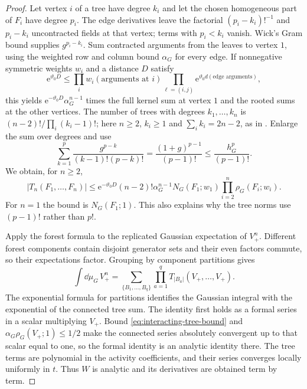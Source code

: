 \begin{proof}
Let vertex $i$ of a tree have degree $k_i$
and let the chosen homogeneous part of $F_i$
have degree $p_i$. The edge derivatives leave
the factorial $(p_i-k_i)!^{-1}$ and $p_i-k_i$
uncontracted fields at that vertex; terms with
$p_i<k_i$ vanish. Wick's Gram bound supplies
$g^{p_i-k_i}$. Sum contracted arguments from
the leaves to vertex $1$, using the weighted
row and column bound $\alpha_G$ for every
edge. If nonnegative symmetric weights $w_i$
and a distance $D$ satisfy
\[
 \mathrm e^{\vartheta_0D}\le
       \prod_iw_i(\text{arguments at }i)
       \prod_{\ell=(i,j)}
          \mathrm e^{\vartheta_0d(\text{edge arguments})},
\]
this yields $\mathrm e^{-\vartheta_0D}\alpha_G^{n-1}$
times the full kernel sum at vertex $1$
and the rooted sums at the other vertices.
The number of trees with degrees $k_1,\ldots,k_n$
is $(n-2)!/\prod_i(k_i-1)!$; here $n\ge2$,
$k_i\ge1$ and $\sum_i k_i=2n-2$, as in
\cite[Proposition~4]{PostnikovLin2019}.
Enlarge the sum over degrees and use
\[
 \sum_{k=1}^{p}
       \frac{g^{p-k}}{(k-1)!(p-k)!}
       =\frac{(1+g)^{p-1}}{(p-1)!}
       \le\frac{h_G^p}{(p-1)!}.
\]
We obtain, for $n\ge2$,
\begin{equation}\label{eq:interacting-tree-bound}
 |T_n(F_1,\ldots,F_n)|
 \le \mathrm e^{-\vartheta_0D}(n-2)!\alpha_G^{n-1}
                N_G(F_1;w_1)\prod_{i=2}^n\rho_G(F_i;w_i).
\end{equation}
For $n=1$ the bound is $N_G(F_1;1)$.
This also explains why the tree norms use
$(p-1)!$ rather than $p!$.

Apply the forest formula to the replicated
Gaussian expectation of $V_+^n$.
Different forest components contain disjoint
generator sets and their even factors commute,
so their expectations factor. Grouping by
component partitions gives
\[
 \int\dd\mu_G\,V_+^n
       =\sum_{\{B_1,\ldots,B_q\}}
                     \prod_{a=1}^qT_{|B_a|}(V_+,\ldots,V_+).
\]
The exponential formula for partitions
identifies the Gaussian integral with the
exponential of the connected tree sum.
The identity first holds as a formal series
in a scalar multiplying $V_+$. Bound
\eqref{eq:interacting-tree-bound} and
$\alpha_G\rho_G(V_+;1)\le1/2$ make the
connected series absolutely convergent up
to that scalar equal to one, so the formal
identity is an analytic identity there.
The tree terms are polynomial in the
activity coefficients, and their series
converges locally uniformly in $t$. Thus $W$
is analytic and its derivatives are obtained
term by term.


\end{proof}
